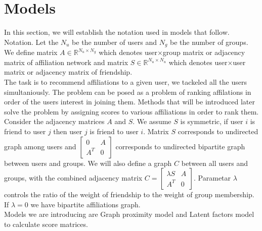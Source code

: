 \documentclass[twoside,twocolumn]{article}
\begin{document}

\section{Models}
In this section, we will establish the notation used in models that follow. \\
Notation. Let the $N_u$ be the number of users and $N_g$ be the number of groups. We define matrix $A \in \mathbb{R}^{N_u \times N_g}$ which denotes user$\times$group matrix or adjacency matrix of affiliation network and matrix $S \in \mathbb{R}^{N_u \times N_u}$ which denotes user$\times$user matrix or adjacency matrix of friendship. \\

The task is to recommend affiliations to a given user, we tackeled all the users simultaniously. The problem can be posed as a problem of ranking affilations in order of the users interest in joining them. Methods that will be introduced later solve the problem by assigning scores to various affiliations in order to rank them. \\

Consider the adjacency matrices $A$ and $S$. We assume $S$ is symmetric, if user $i$ is friend to user $j$ then user $j$ is friend to user $i$. Matrix $S$ corresponds to undirected graph among users and $\begin{bmatrix} 	0 & A\\ 	A^T & 0 \end{bmatrix}$ corresponds to undirected bipartite graph between users and groups. We will also define a graph $C$ between all users and groups, with the combined adjacency matrix  $ C= \begin{bmatrix} 	\lambda S & A\\ 	A^T & 0 \end{bmatrix}$. Parametar $\lambda$ controls the ratio of the weight of friendship to the weight of group membership. If $\lambda = 0$ we have bipartite affiliations graph. \\

Models we are introducing are Graph proximity model and Latent factors model to calculate score matrices.
\end{document}
